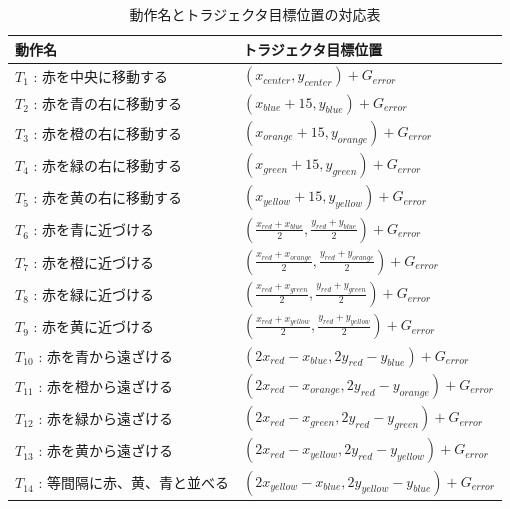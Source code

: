 \begin{table}[h]
	\caption{動作名とトラジェクタ目標位置の対応表}
	\label{table:taskname_15}
  	\begin{tabular}{|l|l|} \hline
    	動作名 & トラジェクタ目標位置\\ \hline
   	$T_{1}$ : 赤を中央に移動する & 
	$
    	\left( x_{center} , y_{center} \right)+G_{error}
    	$
    	\\
    	$T_{2}$ : 赤を青の右に移動する & 
	$
    	\left( x_{blue}+15 , y_{blue} \right)+G_{error}
    	$
    	\\
    	$T_{3}$ : 赤を橙の右に移動する & 
	$
    	\left( x_{orange}+15 , y_{orange} \right)+G_{error}
    	$
    	\\
    	$T_{4}$ : 赤を緑の右に移動する & 
	$
    	\left( x_{green}+15 , y_{green} \right)+G_{error}
    	$
    	\\
    	$T_{5}$ : 赤を黄の右に移動する & 
	$
    	\left( x_{yellow}+15 , y_{yellow} \right)+G_{error}
    	$
    	\\
    	$T_{6}$ : 赤を青に近づける & 
	$
    	\left( \frac{x_{red}+x_{blue}}{2} , \frac{y_{red}+y_{blue}}{2} \right)+G_{error}
    	$
    	\\
    	$T_{7}$ : 赤を橙に近づける & 
	$
    	\left( \frac{x_{red}+x_{orange}}{2} , \frac{y_{red}+y_{orange}}{2} \right)+G_{error}
    	$
    	\\
    	$T_{8}$ : 赤を緑に近づける & 
	$
    	\left( \frac{x_{red}+x_{green}}{2} , \frac{y_{red}+y_{green}}{2} \right)+G_{error}
    	$
    	\\
    	$T_{9}$ : 赤を黄に近づける & 
	$
    	\left( \frac{x_{red}+x_{yellow}}{2} , \frac{y_{red}+y_{yellow}}{2} \right)+G_{error}
    	$
    	\\
    	$T_{10}$ : 赤を青から遠ざける & 
	$
    	\left( 2x_{red}-x_{blue} , 2y_{red}-y_{blue} \right)+G_{error}
    	$
    	\\
    	$T_{11}$ : 赤を橙から遠ざける & 
	$
    	\left( 2x_{red}-x_{orange} , 2y_{red}-y_{orange} \right)+G_{error}
    	$
    	\\
    	$T_{12}$ : 赤を緑から遠ざける & 
	$
    	\left( 2x_{red}-x_{green} , 2y_{red}-y_{green} \right)+G_{error}
    	$
    	\\
    	$T_{13}$ : 赤を黄から遠ざける & 
	$
    	\left( 2x_{red}-x_{yellow} , 2y_{red}-y_{yellow} \right)+G_{error}
    	$
    	\\
    	$T_{14}$ : 等間隔に赤、黄、青と並べる & 
	$
    	\left( 2x_{yellow}-x_{blue} , 2y_{yellow}-y_{blue} \right)+G_{error}
    	$
    	\\

\end{tabular}
\end{table}
